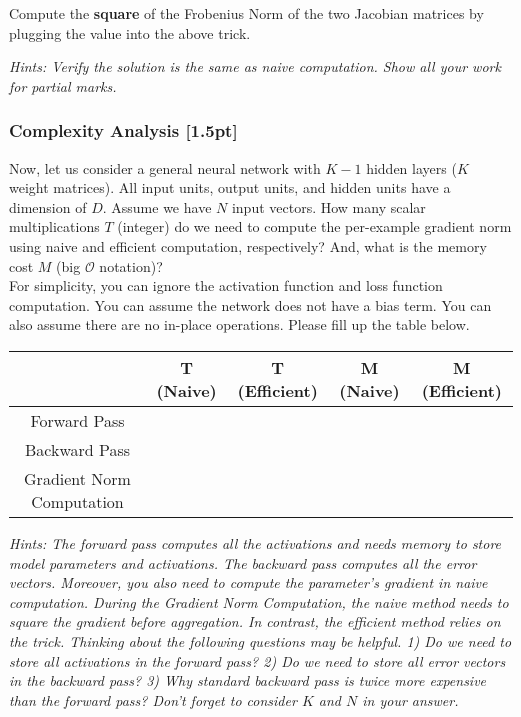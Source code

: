 \noindent Compute the \textbf{square} of the Frobenius Norm of the two Jacobian matrices by plugging the value into the above trick. 

\noindent \emph{Hints: Verify the solution is the same as naive computation. Show all your work for partial marks.}


\subsubsection{Complexity Analysis {\color{blue}[1.5pt]} \LII}
Now, let us consider a general neural network with $K-1$ hidden layers ($K$ weight matrices). All input units, output units, and hidden units have a dimension of $D$. Assume we have $N$ input vectors. How many scalar multiplications $T$ (integer) do we need to compute the per-example gradient norm using naive and efficient computation, respectively? And, what is the memory cost $M$ (big $\mathcal{O}$ notation)? \\

\noindent For simplicity, you can ignore the activation function and loss function computation. You can assume the network does not have a bias term. You can also assume there are no in-place operations. Please fill up the table below. 

\begin{table}[h]
\centering
\begin{tabular}{|c|c|c|c|c|}
\hline
                          & T (Naive) & T (Efficient) & M (Naive) & M (Efficient) \\ \hline
Forward Pass              &           &               &           &               \\ \hline
Backward Pass             &           &               &           &               \\ \hline
Gradient Norm Computation &           &               &           &               \\ \hline
\end{tabular}
\end{table}

\noindent \emph{Hints: The forward pass computes all the activations and needs memory to store model parameters and activations. The backward pass computes all the error vectors. Moreover, you also need to compute the parameter's gradient in naive computation. During the Gradient Norm Computation, the naive method needs to square the gradient before aggregation. In contrast, the efficient method relies on the trick. Thinking about the following questions may be helpful. 1) Do we need to store all activations in the forward pass? 2) Do we need to store all error vectors in the backward pass? 3) Why standard backward pass is twice more expensive than the forward pass? Don't forget to consider $K$ and $N$ in your answer.}


